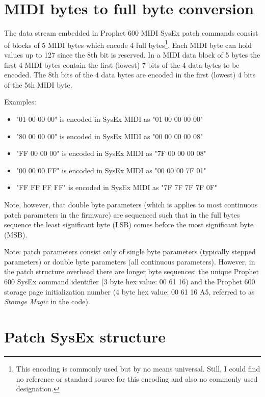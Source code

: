 \documentclass[landscape, 11pt, oneside]{report}
\begin{document}
\section{MIDI bytes to full byte conversion}\label{midibyteconversion}

The data stream embedded in Prophet 600 MIDI SysEx patch commands consist of blocks of 5 MIDI bytes which encode 4 full bytes\footnote{This encoding is commonly used but by no means universal. Still, I could find no reference or standard source for this encoding and also no commonly used designation.}. Each MIDI byte can hold values up to 127 since the 8th bit is reserved. In a MIDI data block of 5 bytes the first 4 MIDI bytes contain the first (lowest) 7 bits of the 4 data bytes to be encoded. The 8th bits of the 4 data bytes are encoded in the first (lowest) 4 bits of the 5th MIDI byte.   

Examples:

\begin{itemize}
  \item "01 00 00 00" is encoded in SysEx MIDI as "01 00 00 00 00"
  \item "80 00 00 00" is encoded in SysEx MIDI as "00 00 00 00 08"
  \item "FF 00 00 00" is encoded in SysEx MIDI as "7F 00 00 00 08"
  \item "00 00 00 FF" is encoded in SysEx MIDI as "00 00 00 7F 01"
  \item "FF FF FF FF" is encoded in SysEx MIDI as "7F 7F 7F 7F 0F"
\end{itemize}
 
Note, however, that double byte parameters (which is applies to most continuous patch parameters in the firmware) are sequenced such that in the full bytes sequence the least significant byte (LSB) comes before the most significant byte (MSB). 

Note: patch parameters  consist only of single byte parameters (typically stepped parameters) or double byte parameters (all continuous parameters). However, in the patch structure overhead there are longer byte sequences: the unique Prophet 600 SysEx command identifier (3 byte hex value: 00 61 16) and the Prophet 600 storage page initialization number (4 byte hex value: 00 61 16 A5, referred to as \textit{Storage Magic} in the code). 

\section{Patch SysEx structure}\label{sysexpatch}
\end{document}
